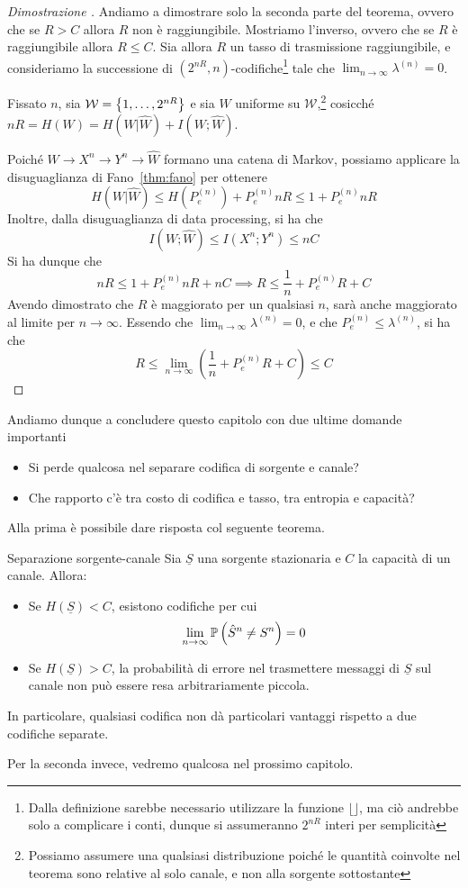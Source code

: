 \begin{proof}[Dimostrazione ]
  Andiamo a dimostrare solo la seconda parte del teorema, ovvero che se \(R>C\) allora \(R\) non è raggiungibile.
  Mostriamo l'inverso, ovvero che se \(R\) è raggiungibile allora \(R\leq C\).
  Sia allora \(R\) un tasso di trasmissione raggiungibile, e consideriamo la successione di \(( 2^{nR},n)\)\nobreakdash-codifiche\footnote{Dalla definizione sarebbe necessario utilizzare la funzione \(\lfloor\rfloor\), ma ciò andrebbe solo a complicare i conti, dunque si assumeranno \(2^{nR}\) interi per semplicità} tale che \(\lim_{n\to\infty} \lambda^{(n)} = 0\).
  
  Fissato \(n\), sia \(\mathcal{W} = \set{1, \ldots, 2^{nR}}\) e sia \(W\) uniforme su \(\mathcal{W}\),\footnote{Possiamo assumere una qualsiasi distribuzione poiché le quantità coinvolte nel teorema sono relative al solo canale, e non alla sorgente sottostante}
  cosicché \(nR = H(W) = H(W|\hat{W}) + I(W;\hat{W})\).

  Poiché \(W \to X^n \to Y^n \to \hat{W}\) formano una catena di Markov, possiamo applicare la disuguaglianza di Fano~\ref{thm:fano} per ottenere
  \[H(W|\hat{W}) \leq H(P_e^{(n)}) + P_e^{(n)} nR\leq 1 + P_e^{(n)} nR\]
  Inoltre, dalla disuguaglianza di data processing, si ha che
  \[I(W;\hat{W}) \leq I(X^n;Y^n) \leq n C \]
  Si ha dunque che
  \[nR \leq 1 + P_e^{(n)} nR + n C \implies R \leq \frac{1}{n} + P_e^{(n)} R + C\]
  Avendo dimostrato che \(R\) è maggiorato per un qualsiasi \(n\), sarà anche maggiorato al limite per \(n\to\infty\).
  Essendo che \(\lim_{n\to\infty} \lambda^{(n)} = 0\), e che \(P_e^{(n)} \leq \lambda^{(n)}\), si ha che
  \[R \leq \lim_{n\to\infty} \left(\frac{1}{n} + P_e^{(n)} R + C\right) \leq C\]
\end{proof}

Andiamo dunque a concludere questo capitolo con due ultime domande importanti
\begin{itemize}
  \item Si perde qualcosa nel separare codifica di sorgente e canale?
  \item Che rapporto c'è tra costo di codifica e tasso, tra entropia e capacità?
\end{itemize}

Alla prima è possibile dare risposta col seguente teorema.

\begin{theorem}{Separazione sorgente-canale}
  Sia \(\underline{S}\) una sorgente stazionaria e \(C\) la capacità di un canale.
  Allora:
  \begin{itemize}
    \item Se \(H(\underline{S}) < C\), esistono codifiche per cui
      \[\lim_{n\to\infty} \Prob[\hat{S}^n \neq S^n] = 0\]
    \item Se \(H(\underline{S}) > C\), la probabilità di errore nel trasmettere messaggi di \(\underline{S}\) sul canale non può essere resa arbitrariamente piccola.
  \end{itemize}
\end{theorem}

In particolare, qualsiasi codifica non dà particolari vantaggi rispetto a due codifiche separate.

Per la seconda invece, vedremo qualcosa nel prossimo capitolo.